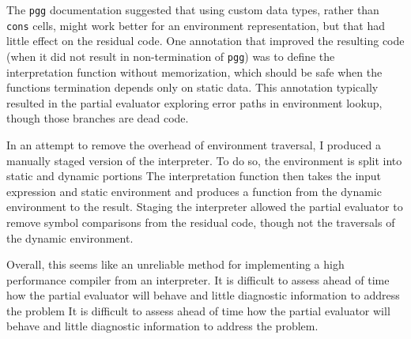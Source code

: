 \documentclass[8pt]{article}
\begin{document}
The \texttt{pgg} documentation suggested that using custom data types, rather than
\texttt{cons} cells, might work better for an environment representation, but
that had little effect on the residual code.
One annotation that improved the resulting code (when it did not result in
non-termination of \texttt{pgg}) was to define the interpretation function without
memorization, which should be safe when the functions termination depends only on
static data.
This annotation typically resulted in the partial evaluator exploring error paths
in environment lookup, though those branches are dead code.

In an attempt to remove the overhead of environment traversal, I produced
a manually staged version of the interpreter.
To do so, the environment is split into static and dynamic portions
The interpretation function then takes the input expression and static environment
and produces a function from the dynamic environment to the result.
Staging the interpreter allowed the partial evaluator to remove symbol comparisons
from the residual code, though not the traversals of the dynamic environment.

Overall, this seems like an unreliable method for implementing a high performance
compiler from an interpreter.
It is difficult to assess ahead of time how the partial evaluator will behave and
little diagnostic information to address the problem
It is difficult to assess ahead of time how the partial evaluator will behave and
little diagnostic information to address the problem.
\end{document}
